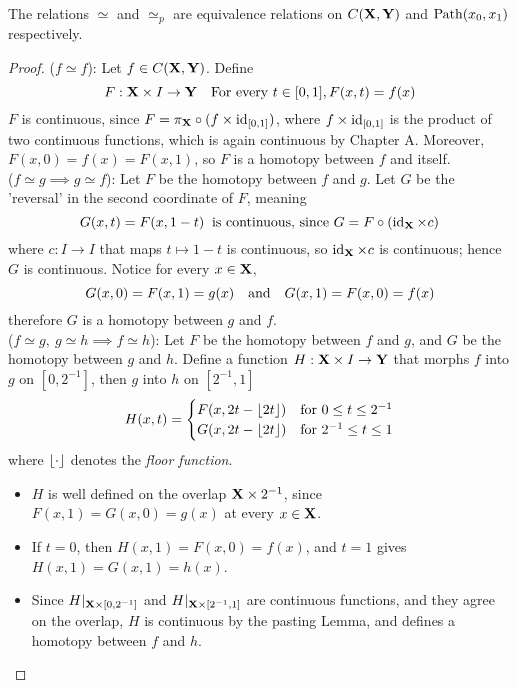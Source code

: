 \documentclass[../main-manifolds.tex]{subfiles}
\providecommand{\htp}{\simeq}    %
\providecommand{\phtp}{\simeq_p} %
\begin{document}
\begin{wts}\label{munkres:lemma-51.1}
    The relations $\htp$ and $\phtp$ are equivalence relations on $C({\mathbf{X}},{\mathbf{Y}})$ and $\Path[x_0,x_1]$ respectively.
\end{wts}
\begin{proof}
    ($f\htp f$): Let $f\in C({\mathbf{X}}, {\mathbf{Y}})$. Define 
    \[
        F:{\mathbf{X}}\times I\to {\mathbf{Y}}\quad \text{For every } t\in [0,1], F(x,t)=f(x)
    \]
    $F$ is continuous, since $F = \pi_{{\mathbf{X}}}\circ (f\times \operatorname{id}_{[0,1]})$, where $f\times \operatorname{id}_{[0,1]}$ is the product of two continuous functions, which is again continuous by Chapter A. Moreover, $F(x,0)=f(x)=F(x,1)$, so $F$ is a homotopy between $f$ and itself.\\

    ($f\htp g\implies g\htp f$): Let $F$ be the homotopy between $f$ and $g$. Let $G$ be the 'reversal' in the second coordinate of $F$, meaning
    \[
        G(x,t)= F(x,1-t)\:\text{ is continuous, since } G = F\circ (\operatorname{id}_{{\mathbf{X}}}\times c)
    \]
    where $c:I\to I$ that maps $t\mapsto 1-t$ is continuous, so $\operatorname{id}_{{\mathbf{X}}}\times c$ is continuous; hence $G$ is continuous. Notice for every $x\in{\mathbf{X}}$,
    \[
        G(x,0)=F(x,1)=g(x)\qqtext{and}G(x,1)=F(x,0)=f(x)
    \]
    therefore $G$ is a homotopy between $g$ and $f$. \\

    ($f\htp g,\: g\htp h\implies f\htp h$): Let $F$ be the homotopy between $f$ and $g$, and $G$ be the homotopy between $g$ and $h$. Define a function $H: {\mathbf{X}}\times I\to {\mathbf{Y}}$ that morphs $f$ into $g$ on $[0,2^{-1}]$, then $g$ into $h$ on $[2^{-1},1]$
    \begin{equation}\label{munkres:lemma-51.1-product}
        H(x,t) = \begin{cases}
            F(x,2t-\lfloor2t\rfloor) & \text{for } 0\leq t\leq 2^{-1}\\
            G(x,2t-\lfloor2t\rfloor) & \text{for } 2^{-1}\leq t\leq 1\\
        \end{cases}
    \end{equation}
    where $\lfloor\cdot\rfloor$ denotes the \emph{floor function}. 
    \begin{itemize}
        \item $H$ is well defined on the overlap ${\mathbf{X}}\times 2^{-1}$, since $F(x,1)=G(x,0)=g(x)$ at every $x\in{\mathbf{X}}$. 
        \item If $t=0$, then $H(x,1)=F(x,0)=f(x)$, and $t=1$ gives $H(x,1)=G(x,1)=h(x)$.
        \item Since $H|_{{\mathbf{X}}\times [0,2^{-1}]}$ and $H|_{{\mathbf{X}}\times[2^{-1},1]}$ are continuous functions, and they agree on the overlap, $H$ is continuous by the pasting Lemma, and defines a homotopy between $f$ and $h$.
    \end{itemize}



\end{proof}
\end{document}
